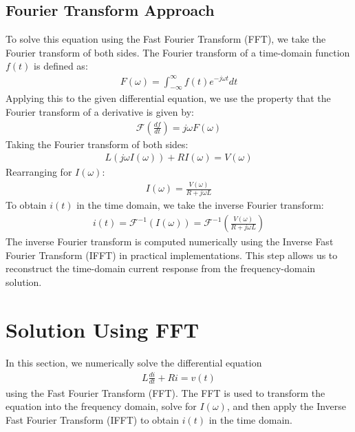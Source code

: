 \documentclass[journal]{IEEEtran}
\begin{document}
\subsection{Fourier Transform Approach}
To solve this equation using the Fast Fourier Transform (FFT), we take the Fourier transform of both sides. The Fourier transform of a time-domain function $f(t)$ is defined as:
\begin{align}
    F(\omega) = \int_{-\infty}^{\infty} f(t) e^{-j\omega t} dt
\end{align}
Applying this to the given differential equation, we use the property that the Fourier transform of a derivative is given by:
\begin{align}
    \mathcal{F} \left( \frac{df}{dt} \right) = j\omega F(\omega)
\end{align}
Taking the Fourier transform of both sides:
\begin{align}
    L (j\omega I(\omega)) + R I(\omega) = V(\omega)
\end{align}
Rearranging for $I(\omega)$:
\begin{align}
    I(\omega) = \frac{V(\omega)}{R + j\omega L}
\end{align}
To obtain $i(t)$ in the time domain, we take the inverse Fourier transform:
\begin{align}
    i(t) = \mathcal{F}^{-1} \left( I(\omega) \right) = \mathcal{F}^{-1} \left( \frac{V(\omega)}{R + j\omega L} \right)
\end{align}
The inverse Fourier transform is computed numerically using the Inverse Fast Fourier Transform (IFFT) in practical implementations. This step allows us to reconstruct the time-domain current response from the frequency-domain solution.
\section{Solution Using FFT}
In this section, we numerically solve the differential equation
\begin{align}
    L \frac{di}{dt} + Ri = v(t)
\end{align}
using the Fast Fourier Transform (FFT). The FFT is used to transform the equation into the frequency domain, solve for $I(\omega)$, and then apply the Inverse Fast Fourier Transform (IFFT) to obtain $i(t)$ in the time domain.
\end{document}
